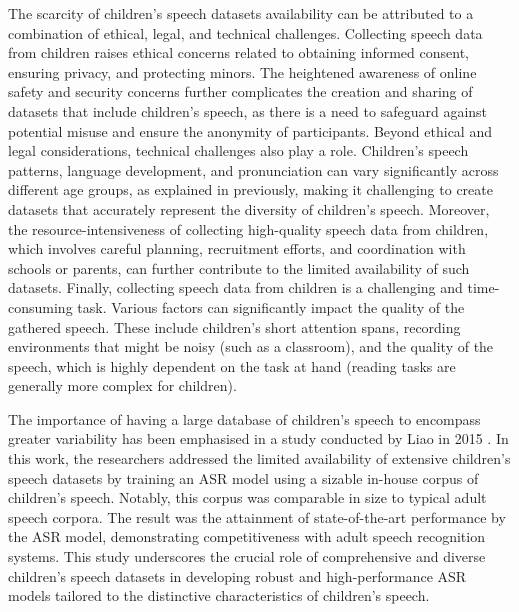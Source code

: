The scarcity of children's speech datasets availability can be attributed to a combination of ethical, legal, and technical challenges. Collecting speech data from children raises ethical concerns related to obtaining informed consent, ensuring privacy, and protecting minors. The heightened awareness of online safety and security concerns further complicates the creation and sharing of datasets that include children's speech, as there is a need to safeguard against potential misuse and ensure the anonymity of participants.
Beyond ethical and legal considerations, technical challenges also play a role. Children's speech patterns, language development, and pronunciation can vary significantly across different age groups, as explained in previously, making it challenging to create datasets that accurately represent the diversity of children's speech. Moreover, the resource-intensiveness of collecting high-quality speech data from children, which involves careful planning, recruitment efforts, and coordination with schools or parents, can further contribute to the limited availability of such datasets.
Finally, collecting speech data from children is a challenging and time-consuming task. Various factors can significantly impact the quality of the gathered speech. These include children's short attention spans, recording environments that might be noisy (such as a classroom), and the quality of the speech, which is highly dependent on the task at hand (reading tasks are generally more complex for children).

The importance of having a large database of children's speech to encompass greater variability has been emphasised in a study conducted by Liao in 2015 \cite{asr-google}. In this work, the researchers addressed the limited availability of extensive children's speech datasets by training an ASR model using a sizable in-house corpus of children's speech. Notably, this corpus was comparable in size to typical adult speech corpora. The result was the attainment of state-of-the-art performance by the ASR model, demonstrating competitiveness with adult speech recognition systems. This study underscores the crucial role of comprehensive and diverse children's speech datasets in developing robust and high-performance ASR models tailored to the distinctive characteristics of children's speech.



